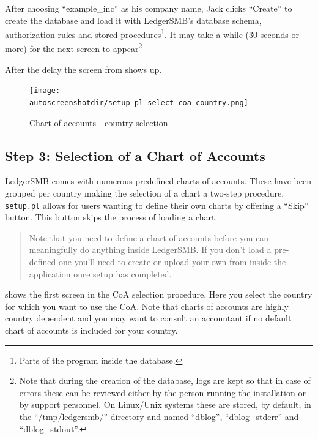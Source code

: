 After choosing ``example\_inc'' as his company name,
Jack clicks ``Create'' to create the database and load it with LedgerSMB's database
schema, authorization rules and stored
procedures\footnote{Parts of the program inside the database.}. It may
take a while (30 seconds or more) for the next screen to appear\footnote{Note 
    that during the creation of the database, logs are kept so that in case of
    errors these can be reviewed either by the person running the installation or by
    support personnel.  On Linux/Unix systems these are stored, by default, in the
    ``/tmp/ledgersmb/'' directory and named ``dblog'', ``dblog\_stderr'' and ``dblog\_stdout''.}

After the delay the screen from  shows up.

\begin{figure}[H]
\centering
\texttt{[image: \\autoscreenshotdir/setup-pl-select-coa-country.png]}
\caption{Chart of accounts - country selection}
\label{fig:setup-step2}
\end{figure}


\subsection{Step 3: Selection of a Chart of Accounts}
\label{subsec-create-setup-select-coa}

LedgerSMB comes with numerous predefined charts of accounts. These have been grouped
per country making the selection of a chart a two-step procedure. \texttt{setup.pl} allows for
users wanting to define their own charts by offering a ``Skip'' button. This button
skips the process of loading a chart.

\begin{quote}
Note that you need to define a chart of accounts before you can meaningfully do anything
inside LedgerSMB. If you don't load a pre-defined one you'll need to create or upload
your own from inside the application once setup has completed.
\end{quote}

 shows the first screen in the \acrshort{CoA} selection procedure.
Here you select the country for which you want to use the \acrshort{CoA}. Note
that charts of accounts are highly country dependent and you may want to consult
an accountant if no default chart of accounts is included for your country.

